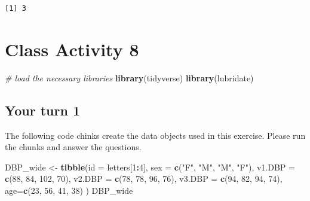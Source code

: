 \documentclass[
]{book}
\newenvironment{Shaded}{\begin{snugshade}}{\end{snugshade}}
\newcommand{\AttributeTok}[1]{\textcolor[rgb]{0.13,0.29,0.53}{#1}}
\newcommand{\CommentTok}[1]{\textcolor[rgb]{0.56,0.35,0.01}{\textit{#1}}}
\newcommand{\DecValTok}[1]{\textcolor[rgb]{0.00,0.00,0.81}{#1}}
\newcommand{\FunctionTok}[1]{\textcolor[rgb]{0.13,0.29,0.53}{\textbf{#1}}}
\newcommand{\NormalTok}[1]{#1}
\newcommand{\OtherTok}[1]{\textcolor[rgb]{0.56,0.35,0.01}{#1}}
\newcommand{\SpecialCharTok}[1]{\textcolor[rgb]{0.81,0.36,0.00}{\textbf{#1}}}
\newcommand{\StringTok}[1]{\textcolor[rgb]{0.31,0.60,0.02}{#1}}
\begin{document}
\begin{verbatim}
[1] 3
\end{verbatim}

\hypertarget{class-activity-8}{%
\chapter{Class Activity 8}\label{class-activity-8}}

\begin{Shaded}
\begin{Highlighting}[]
\CommentTok{\# load the necessary libraries}
\FunctionTok{library}\NormalTok{(tidyverse)}
\FunctionTok{library}\NormalTok{(lubridate)}
\end{Highlighting}
\end{Shaded}

\hypertarget{your-turn-1-1}{%
\section{Your turn 1}\label{your-turn-1-1}}

The following code chinks create the data objects used in this exercise. Please run the chunks and answer the questions.

\begin{Shaded}
\begin{Highlighting}[]
\NormalTok{DBP\_wide }\OtherTok{\textless{}{-}} \FunctionTok{tibble}\NormalTok{(}\AttributeTok{id =}\NormalTok{ letters[}\DecValTok{1}\SpecialCharTok{:}\DecValTok{4}\NormalTok{],}
 \AttributeTok{sex =} \FunctionTok{c}\NormalTok{(}\StringTok{"F"}\NormalTok{, }\StringTok{"M"}\NormalTok{, }\StringTok{"M"}\NormalTok{, }\StringTok{"F"}\NormalTok{),}
 \AttributeTok{v1.DBP =} \FunctionTok{c}\NormalTok{(}\DecValTok{88}\NormalTok{, }\DecValTok{84}\NormalTok{, }\DecValTok{102}\NormalTok{, }\DecValTok{70}\NormalTok{),}
 \AttributeTok{v2.DBP =} \FunctionTok{c}\NormalTok{(}\DecValTok{78}\NormalTok{, }\DecValTok{78}\NormalTok{, }\DecValTok{96}\NormalTok{, }\DecValTok{76}\NormalTok{),}
 \AttributeTok{v3.DBP =} \FunctionTok{c}\NormalTok{(}\DecValTok{94}\NormalTok{, }\DecValTok{82}\NormalTok{, }\DecValTok{94}\NormalTok{, }\DecValTok{74}\NormalTok{),}
 \AttributeTok{age=}\FunctionTok{c}\NormalTok{(}\DecValTok{23}\NormalTok{, }\DecValTok{56}\NormalTok{, }\DecValTok{41}\NormalTok{, }\DecValTok{38}\NormalTok{)}
\NormalTok{ )}
\NormalTok{DBP\_wide}
\end{Highlighting}
\end{Shaded}
\end{document}
